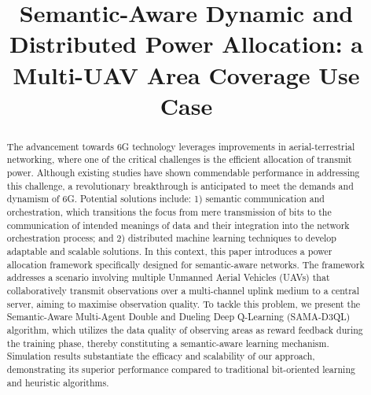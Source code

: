\documentclass[conference]{IEEEtran}
\begin{document}
\title{Semantic-Aware Dynamic and Distributed Power Allocation: a Multi-UAV Area Coverage Use Case}

\author{
    \IEEEauthorblockA{
       \textsuperscript{1} \textit{Ruhr University Bochum, Bochum, Germany; hr.mazandarani@ieee.org, tarik.taleb@rub.de} \\
        \textsuperscript{2} \textit{ICTFicial Oy, Espoo, Finland; masoud.shokrnezhad@ictficial.com}
    }
}



\maketitle

\begin{abstract}
The advancement towards 6G technology leverages improvements in aerial-terrestrial networking, where one of the critical challenges is the efficient allocation of transmit power. Although existing studies have shown commendable performance in addressing this challenge, a revolutionary breakthrough is anticipated to meet the demands and dynamism of 6G. Potential solutions include: 1) semantic communication and orchestration, which transitions the focus from mere transmission of bits to the communication of intended meanings of data and their integration into the network orchestration process; and 2) distributed machine learning techniques to develop adaptable and scalable solutions. In this context, this paper introduces a power allocation framework specifically designed for semantic-aware networks. The framework addresses a scenario involving multiple Unmanned Aerial Vehicles (UAVs) that collaboratively transmit observations over a multi-channel uplink medium to a central server, aiming to maximise observation quality. To tackle this problem, we present the Semantic-Aware Multi-Agent Double and Dueling Deep Q-Learning (SAMA-D3QL) algorithm, which utilizes the data quality of observing areas as reward feedback during the training phase, thereby constituting a semantic-aware learning mechanism. Simulation results substantiate the efficacy and scalability of our approach, demonstrating its superior performance compared to traditional bit-oriented learning and heuristic algorithms.
\end{abstract}
\end{document}
